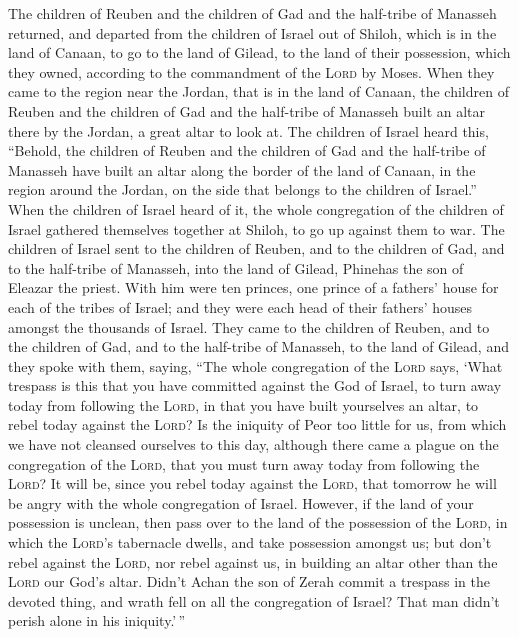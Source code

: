  The children of Reuben and the children of Gad and the
half-tribe of Manasseh returned, and departed from the children of
Israel out of Shiloh, which is in the land of Canaan, to go to the land
of Gilead, to the land of their possession, which they owned, according
to the commandment of the \textsc{Lord} by Moses.  When
they came to the region near the Jordan, that is in the land of Canaan,
the children of Reuben and the children of Gad and the half-tribe of
Manasseh built an altar there by the Jordan, a great altar to look at.
 The children of Israel heard this, ``Behold, the
children of Reuben and the children of Gad and the half-tribe of
Manasseh have built an altar along the border of the land of Canaan, in
the region around the Jordan, on the side that belongs to the children
of Israel.''  When the children of Israel heard of it,
the whole congregation of the children of Israel gathered themselves
together at Shiloh, to go up against them to war.  The
children of Israel sent to the children of Reuben, and to the children
of Gad, and to the half-tribe of Manasseh, into the land of Gilead,
Phinehas the son of Eleazar the priest.  With him were
ten princes, one prince of a fathers' house for each of the tribes of
Israel; and they were each head of their fathers' houses amongst the
thousands of Israel.  They came to the children of
Reuben, and to the children of Gad, and to the half-tribe of Manasseh,
to the land of Gilead, and they spoke with them, saying, 
``The whole congregation of the \textsc{Lord} says, `What trespass is
this that you have committed against the God of Israel, to turn away
today from following the \textsc{Lord}, in that you have built
yourselves an altar, to rebel today against the \textsc{Lord}?
 Is the iniquity of Peor too little for us, from which we
have not cleansed ourselves to this day, although there came a plague on
the congregation of the \textsc{Lord},  that you must
turn away today from following the \textsc{Lord}? It will be, since you
rebel today against the \textsc{Lord}, that tomorrow he will be angry
with the whole congregation of Israel.  However, if the
land of your possession is unclean, then pass over to the land of the
possession of the \textsc{Lord}, in which the \textsc{Lord}'s tabernacle
dwells, and take possession amongst us; but don't rebel against the
\textsc{Lord}, nor rebel against us, in building an altar other than the
\textsc{Lord} our God's altar.  Didn't Achan the son of
Zerah commit a trespass in the devoted thing, and wrath fell on all the
congregation of Israel? That man didn't perish alone in his
iniquity.'\,''

